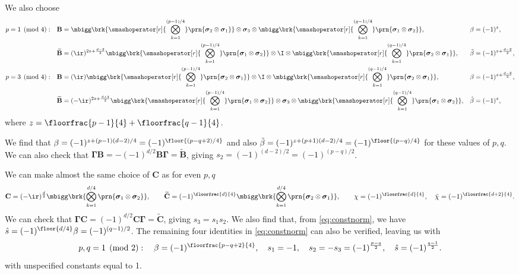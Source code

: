 \documentclass[11pt]{article}
\newcommand{\Gammab}{\boldsymbol{\Gamma}}
\newcommand{\B}{\mathbf{B}}
\renewcommand{\C}{\mathbf{C}}
\newcommand{\Bt}{\widetilde{\B}}
\newcommand{\Ct}{\widetilde{\C}}
\newcommand{\sigmab}{\boldsymbol{\sigma}}
\newcommand{\betat}{\tilde{\beta}}
\newcommand{\chit}{\tilde{\chi}}
\begin{document}
We also choose
%
\begin{equation*}
\begin{aligned}
  p &= 1 \pmod 4: &
  \B &= \mbigg\brk{\smashoperator[r]{\bigotimes_{k=1}^{(p-1)/4}} 
        \prn{\sigmab_2 \otimes \sigmab_1}} \otimes
        \sigmab_3 \otimes
        \mbigg\brk{\smashoperator[r]{\bigotimes_{k=1}^{(q-1)/4}}
        \prn{\sigmab_1 \otimes \sigmab_2}}, &
  \beta &= (-1)^z, \\ &&
  \Bt &= (\ir)^{2z + \frac{d-2}{2}}
        \mbigg\brk{\smashoperator[r]{\bigotimes_{k=1}^{(p-1)/4}}
        \prn{\sigmab_1 \otimes \sigmab_2}} \otimes
        \I \otimes
        \mbigg\brk{\smashoperator[r]{\bigotimes_{k=1}^{(q-1)/4}}
        \prn{\sigmab_2 \otimes \sigmab_1}}, &
  \betat &= (-1)^{z + \frac{d-2}{2}}, \\ 
  p &= 3 \pmod 4: &
  \B &= (\ir)
        \mbigg\brk{\smashoperator[r]{\bigotimes_{k=1}^{(p-1)/4}}
        \prn{\sigmab_2 \otimes \sigmab_1}} \otimes
        \I \otimes
        \mbigg\brk{\smashoperator[r]{\bigotimes_{k=1}^{(q-1)/4}}
        \prn{\sigmab_2 \otimes \sigmab_1}}, &
  \beta &= (-1)^{z + \frac{d-2}{2}}, \\ &&
  \Bt &= (-\ir)^{2z + \frac{d+4}{2}}
        \mbigg\brk{\smashoperator[r]{\bigotimes_{k=1}^{(p-1)/4}}
        \prn{\sigmab_1 \otimes \sigmab_2}} \otimes
        \sigmab_3 \otimes
        \mbigg\brk{\smashoperator[r]{\bigotimes_{k=1}^{(q-1)/4}}
        \prn{\sigmab_1 \otimes \sigmab_2}}, &
  \betat &= (-1)^z, 
\end{aligned}
\end{equation*}
%
where $z = \floorfrac{p-1}{4} + \floorfrac{q-1}{4}$.

We find that \( \beta = (-1)^{z + (p-1)(d-2)/4} = (-1)^{\floor{(p-q+2)/4}} \) 
and also \( \betat = (-1)^{z + (p+1)(d-2)/4} = (-1)^{\floor{(p-q)/4}} \) for these values of \(p,q\).
We can also check that $\Gammab \B = -(-1)^{d/2}\B \Gammab = \Bt$, giving $s_2 = (-1)^{(d-2)/2} = (-1)^{(p-q)/2}$.

We can make almost the same choice of $\C$ as for even $p,q$
%
\begin{equation*}
  \C =  (-\ir)^{\frac{d}{2}}
        \mbigg\brk{\bigotimes_{k=1}^{d/4} \prn{\sigmab_1 \otimes \sigmab_2}},
  \qquad
  \Ct = (-1)^{\floorfrac{d}{4}}
        \mbigg\brk{\bigotimes_{k=1}^{d/4} \prn{\sigmab_2 \otimes \sigmab_1}},
  \qquad
  \chi = (-1)^{\floorfrac{d}{4}},
  \quad
  \chit = (-1)^{\floorfrac{d+2}{4}}.
\end{equation*}
%
We can check that $\Gammab \C = (-1)^{d/2}\C \Gammab = \Ct$, giving $s_3 = s_1 s_2$.
We also find that, from \cref{eq:constnorm}, we have
\( \hat{s} = (-1)^{\floor{d/4}} \beta = (-1)^{(q-1)/2} \).
The remaining four identities in \cref{eq:constnorm} can also be verified, leaving us with
%
\begin{equation}\label{eq:constoddodd}
  p, q = 1 \pmod 2 : \quad
  \beta = (-1)^{\floorfrac{p-q+2}{4}}, \quad
  s_1 = -1, \quad
  s_2 = -s_3 = (-1)^{\frac{p-q}{2}}, \quad
  \hat{s} = (-1)^{\frac{q-1}{2}}.
\end{equation}
%
with unspecified constants equal to 1.
\end{document}
